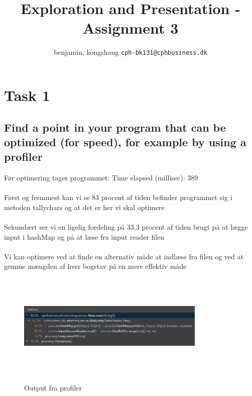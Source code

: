 \documentclass[12pt]{article}
\begin{document}
\title{Exploration and Presentation - Assignment 3}
\maketitle
\author{
  benjamin, kongshaug
  \texttt{cph-bk131@cphbusiness.dk}

}
\thispagestyle{empty}
\pagebreak

\setcounter{secnumdepth}{4}
\tableofcontents

\pagebreak

\section{Task 1}

\subsection{Find a point in your program that can be optimized (for speed), for example by using a profiler}

Før optimering tager programmet: Time elapsed (millisec): 389 \\ \\
Først og fremmest kan vi se 83 procent af tiden befinder programmet sig i metoden tallychars og at det er her vi skal optimere \\ \\
Sekundært ser vi en ligelig fordeling på 33,3 procent af tiden brugt på at lægge input i hashMap og på at læse fra input reader filen \\ \\
Vi kan optimere ved at finde en alternativ måde at indlæse fra filen og ved at gemme mængden af hver bogstav på en mere effektiv måde

\begin{figure}[h!]
\begin{center}
\caption{Output fra profiler}
\includegraphics[width=9cm,height=5cm]{før_optimering.PNG}
\label{fig:cclogo}
\end{center}
\label{fig:firstFigureLabel}
\end{figure}
\end{document}
